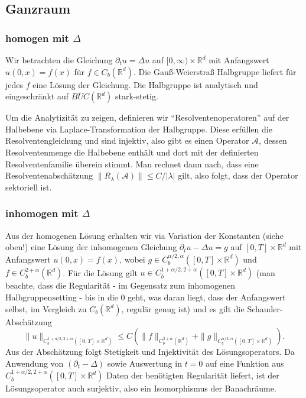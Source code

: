 \documentclass[11pt,a4paper]{scrartcl}
\newcommand{\R}{\mathbb{R}} %
\newcommand{\A}{\mathcal{A}}
\theoremstyle{plain}
\theoremstyle{definition}
\theoremstyle{remark}
\begin{document}
\subsection{Ganzraum}

\subsubsection{homogen mit $\Delta$}

Wir betrachten die Gleichung $\partial_t u = \Delta u$ auf $[0,\infty)\times \R^d$ mit Anfangswert $u(0,x)=f(x)$ für $f\in C_b(\R^d)$. Die Gauß-Weierstraß Halbgruppe liefert für jedes $f$ eine Lösung der Gleichung. Die Halbgruppe ist analytisch und eingeschränkt auf $BUC(\R^d)$ stark-stetig.

Um die Analytizität zu zeigen, definieren wir \enquote{Resolventenoperatoren} auf der Halbebene via Laplace-Transformation der Halbgruppe. Diese erfüllen die Resolventengleichung und sind injektiv, also gibt es einen Operator $\A$, dessen Resolventenmenge die Halbebene enthält und dort mit der definierten Resolventenfamilie überein stimmt. Man rechnet dann nach, dass eine Resolventenabschätzung $\|R_\lambda(\A)\|\leq C/|\lambda|$ gilt, also folgt, dass der Operator sektoriell ist.

\subsubsection{inhomogen mit $\Delta$}

Aus der homogenen Lösung erhalten wir via Variation der Konstanten (siehe oben!) eine Lösung der inhomogenen Gleichung $\partial_t u - \Delta u = g$ auf $[0,T]\times \R^d$ mit Anfangswert $u(0,x)=f(x)$, wobei $g\in C_b^{\alpha/2,\alpha}([0,T]\times \R^d)$ und $f\in C_b^{2+\alpha}(\R^d)$. Für die Lösung gilt $u\in C_b^{1+\alpha/2, 2+\alpha}([0,T]\times \R^d)$ (man beachte, dass die Regularität - im Gegensatz zum inhomogenen Halbgruppensetting - bis in die $0$ geht, was daran liegt, dass der Anfangswert selbst, im Vergleich zu $C_b(\R^d)$, regulär genug ist) und es gilt die Schauder-Abschätzung $$\|u\|_{C_b^{1+\alpha/2, 2+\alpha}([0,T]\times \R^d)}\leq C \left( \|f\|_{C_b^{2+\alpha}(\R^d)} + \|g\|_{C_b^{\alpha/2,\alpha}([0,T]\times \R^d)} \right).$$ Aus der Abschätzung folgt Stetigkeit und Injektivität des Lösungsoperators. Da Anwendung von $(\partial_t - \Delta)$ sowie Auswertung in $t=0$ auf eine Funktion aus $C_b^{1+\alpha/2, 2+\alpha}([0,T]\times \R^d)$ Daten der benötigten Regularität liefert, ist der Lösungsoperator auch surjektiv, also ein Isomorphismus der Banachräume.
\end{document}
